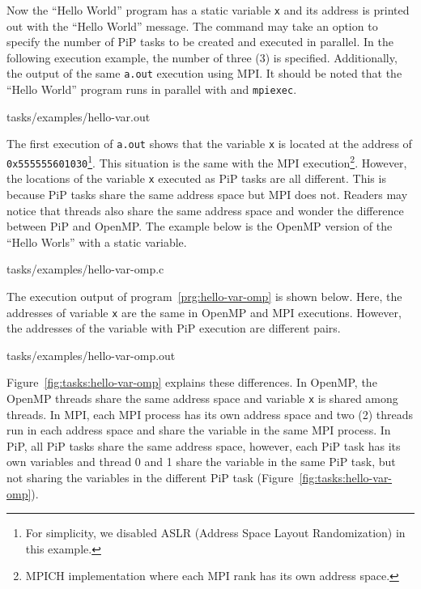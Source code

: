 Now the ``Hello World'' program has a static variable
{\tt x} and its address is printed out with the ``Hello World''
message. The  command may take an option to specify
the number of PiP tasks to be created and executed in parallel. In the
following execution example, the number of three (3) is
specified. Additionally, the output of the same {\tt a.out} execution
using MPI. It should be noted that the ``Hello World'' program runs in
parallel with  and {\tt mpiexec}. 

 {tasks/examples/hello-var.out}

The first execution of {\tt a.out} shows that the variable {\tt x} is
located at the address of {\tt 0x555555601030}\footnote{For
simplicity, we disabled ASLR (Address Space Layout Randomization) in
this example.}. This situation is the 
same with the MPI execution\footnote{MPICH implementation where each
MPI rank has its own address space.}. However, the locations of the
variable {\tt x} executed as PiP tasks are all different.
This is because PiP tasks share the same address space but MPI does
not. Readers may notice that threads also share the same address
space and wonder the difference between PiP and OpenMP. The example
below is the OpenMP version of the ``Hello Worls'' with a static
variable. 

 {tasks/examples/hello-var-omp.c}

The execution output of program~\ref{prg:hello-var-omp} is shown
below. Here, the addresses of variable {\tt x} are the same in OpenMP
and MPI executions. However, the addresses of the variable with PiP
execution are different pairs. 

 {tasks/examples/hello-var-omp.out}

Figure~\ref{fig:tasks:hello-var-omp} explains these differences. In
OpenMP, the OpenMP threads share the same address space and variable
{\tt x} is shared among threads. In MPI, each MPI process has its own
address space and two (2) threads run in each address space and share
the variable in the same MPI process. In PiP,
all PiP tasks share the same address space, however, each PiP task has
its own variables and thread 0 and 1 share
the variable in the same PiP task, but not sharing the variables in
the different PiP task (Figure~\ref{fig:tasks:hello-var-omp}).

